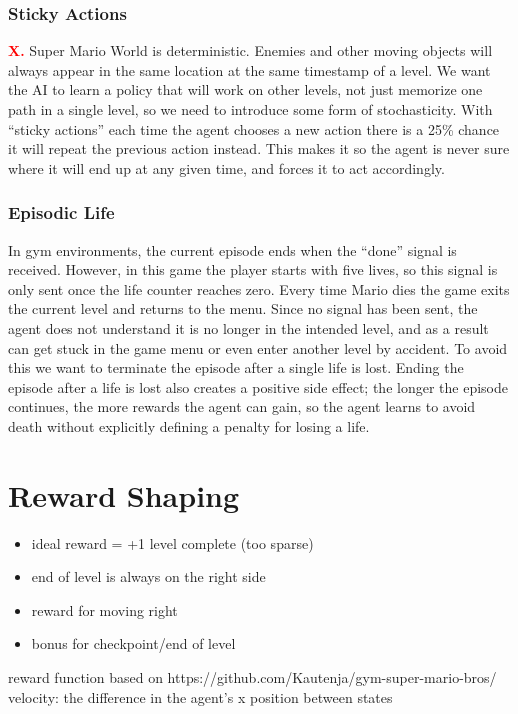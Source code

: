 \documentclass{article}
\begin{document}
    \subsubsection{Sticky Actions}
    \textbf{\textcolor{red}{X.}}
    Super Mario World is deterministic. 
    Enemies and other moving objects will always appear in the same location at the same timestamp of a level.
    We want the AI to learn a policy that will work on other levels, not just memorize one path in a single level, so we need to introduce some form of stochasticity.
    With ``sticky actions'' each time the agent chooses a new action there is a 25\% chance it will repeat the previous action instead.
    This makes it so the agent is never sure where it will end up at any given time, and forces it to act accordingly.

    \subsubsection{Episodic Life}
    In gym environments, the current episode ends when the ``done'' signal is received.
    However, in this game the player starts with five lives, so this signal is only sent once the life counter reaches zero.
    Every time Mario dies the game exits the current level and returns to the menu.
    Since no signal has been sent, the agent does not understand it is no longer in the intended level, and as a result can get stuck in the game menu or even enter another level by accident.
    To avoid this we want to terminate the episode after a single life is lost.
    Ending the episode after a life is lost also creates a positive side effect; the longer the episode continues, the more rewards the agent can gain, so the agent learns to avoid death without explicitly defining a penalty for losing a life.

    \section{Reward Shaping}
    \begin{itemize}
        \item ideal reward = +1 level complete (too sparse)
        \item end of level is always on the right side
        \item reward for moving right
        \item bonus for checkpoint/end of level
    \end{itemize}
    reward function based on https://github.com/Kautenja/gym-super-mario-bros/
    velocity: the difference in the agent's x position between states
\end{document}
